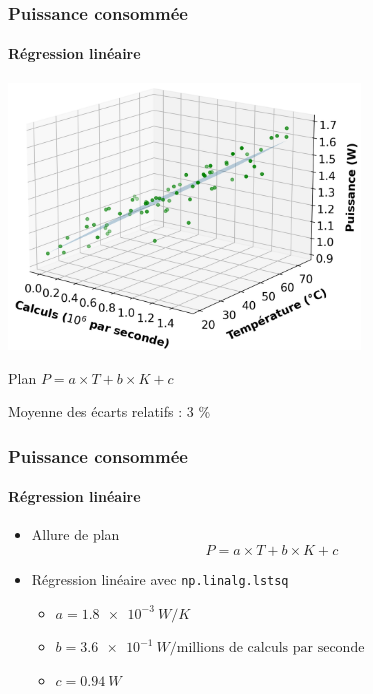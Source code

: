 \documentclass[a4paper,11pt]{beamer}
\newcommand{\p}{\texttt} %
\begin{document}
\begin{frame}
    \frametitle{Puissance consommée}
    \framesubtitle{Régression linéaire}

    \begin{center}
        \includegraphics[width=0.7\textwidth]{regression_cube.png}

        Plan $P = a \times T + b \times K + c$

        Moyenne des écarts relatifs : 3 \%
    \end{center}
\end{frame}

\begin{frame}
    \frametitle{Puissance consommée}
    \framesubtitle{Régression linéaire}

    \begin{itemize}
        \item Allure de plan
        $$P = a \times T + b \times K + c$$
        \item Régression linéaire avec \p{np.linalg.lstsq}
        \begin{itemize}
            \item $a = \SI{1.8e-3}{W/K}$
            \item $b = \SI{3.6e-1}{W/\text{millions de calculs par seconde}}$
            \item $c = \SI{0.94}{W}$
        \end{itemize}
    \end{itemize}
\end{frame}
\end{document}
